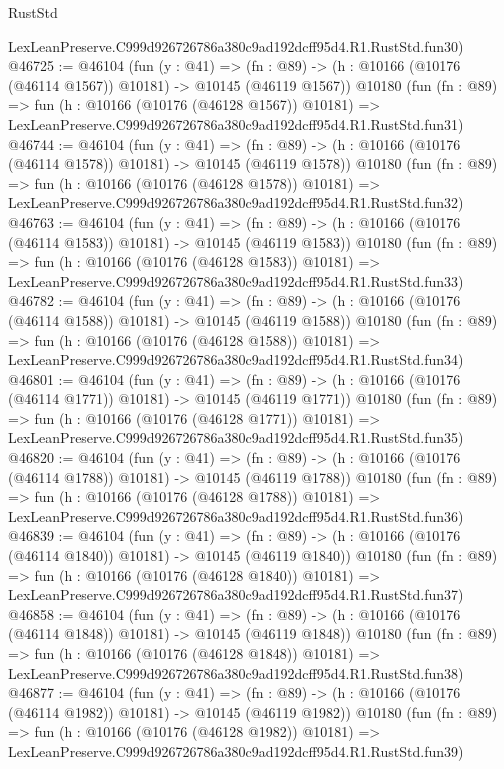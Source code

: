 \begin{lexlean}{RustStd}
\begin{coremodule}
    LexLeanPreserve.C999d926726786a380c9ad192dcff95d4.R1.RustStd.fun30)
@46725 := @46104
    (fun (y : @41) =>
    (fn : @89) -> (h : @10166 (@10176 (@46114 @1567)) @10181) -> @10145 (@46119 @1567))
    @10180
    (fun (fn : @89) =>
    fun (h : @10166 (@10176 (@46128 @1567)) @10181) =>
    LexLeanPreserve.C999d926726786a380c9ad192dcff95d4.R1.RustStd.fun31)
@46744 := @46104
    (fun (y : @41) =>
    (fn : @89) -> (h : @10166 (@10176 (@46114 @1578)) @10181) -> @10145 (@46119 @1578))
    @10180
    (fun (fn : @89) =>
    fun (h : @10166 (@10176 (@46128 @1578)) @10181) =>
    LexLeanPreserve.C999d926726786a380c9ad192dcff95d4.R1.RustStd.fun32)
@46763 := @46104
    (fun (y : @41) =>
    (fn : @89) -> (h : @10166 (@10176 (@46114 @1583)) @10181) -> @10145 (@46119 @1583))
    @10180
    (fun (fn : @89) =>
    fun (h : @10166 (@10176 (@46128 @1583)) @10181) =>
    LexLeanPreserve.C999d926726786a380c9ad192dcff95d4.R1.RustStd.fun33)
@46782 := @46104
    (fun (y : @41) =>
    (fn : @89) -> (h : @10166 (@10176 (@46114 @1588)) @10181) -> @10145 (@46119 @1588))
    @10180
    (fun (fn : @89) =>
    fun (h : @10166 (@10176 (@46128 @1588)) @10181) =>
    LexLeanPreserve.C999d926726786a380c9ad192dcff95d4.R1.RustStd.fun34)
@46801 := @46104
    (fun (y : @41) =>
    (fn : @89) -> (h : @10166 (@10176 (@46114 @1771)) @10181) -> @10145 (@46119 @1771))
    @10180
    (fun (fn : @89) =>
    fun (h : @10166 (@10176 (@46128 @1771)) @10181) =>
    LexLeanPreserve.C999d926726786a380c9ad192dcff95d4.R1.RustStd.fun35)
@46820 := @46104
    (fun (y : @41) =>
    (fn : @89) -> (h : @10166 (@10176 (@46114 @1788)) @10181) -> @10145 (@46119 @1788))
    @10180
    (fun (fn : @89) =>
    fun (h : @10166 (@10176 (@46128 @1788)) @10181) =>
    LexLeanPreserve.C999d926726786a380c9ad192dcff95d4.R1.RustStd.fun36)
@46839 := @46104
    (fun (y : @41) =>
    (fn : @89) -> (h : @10166 (@10176 (@46114 @1840)) @10181) -> @10145 (@46119 @1840))
    @10180
    (fun (fn : @89) =>
    fun (h : @10166 (@10176 (@46128 @1840)) @10181) =>
    LexLeanPreserve.C999d926726786a380c9ad192dcff95d4.R1.RustStd.fun37)
@46858 := @46104
    (fun (y : @41) =>
    (fn : @89) -> (h : @10166 (@10176 (@46114 @1848)) @10181) -> @10145 (@46119 @1848))
    @10180
    (fun (fn : @89) =>
    fun (h : @10166 (@10176 (@46128 @1848)) @10181) =>
    LexLeanPreserve.C999d926726786a380c9ad192dcff95d4.R1.RustStd.fun38)
@46877 := @46104
    (fun (y : @41) =>
    (fn : @89) -> (h : @10166 (@10176 (@46114 @1982)) @10181) -> @10145 (@46119 @1982))
    @10180
    (fun (fn : @89) =>
    fun (h : @10166 (@10176 (@46128 @1982)) @10181) =>
    LexLeanPreserve.C999d926726786a380c9ad192dcff95d4.R1.RustStd.fun39)

\end{coremodule}
\end{lexlean}
